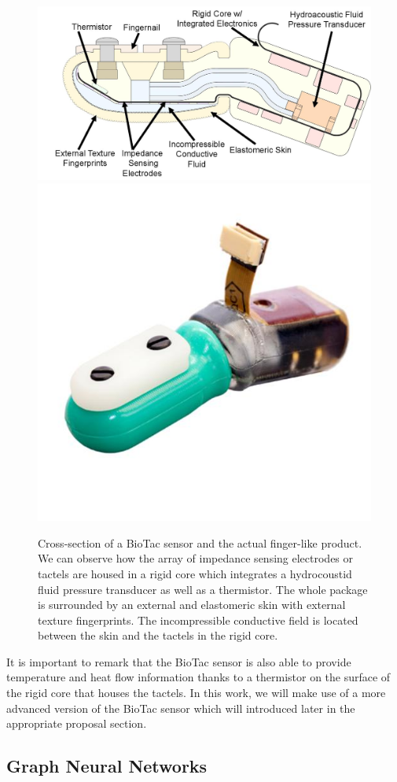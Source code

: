 \begin{figure}[!thb]
    \centering
    \includegraphics[width=0.65\linewidth]{Figures/Tactile/biotac_1}
    \includegraphics[width=0.34\linewidth]{Figures/Tactile/biotac_2}
    \caption{Cross-section of a BioTac sensor \cite{Syntouch2018} and the actual finger-like product. We can observe how the array of impedance sensing electrodes or tactels are housed in a rigid core which integrates a hydrocoustid fluid pressure transducer as well as a thermistor. The whole package is surrounded by an external and elastomeric skin with external texture fingerprints. The incompressible conductive field is located between the skin and the tactels in the rigid core.}
    \label{fig:tactile:biotac_sensor}
\end{figure}

It is important to remark that the BioTac sensor is also able to provide temperature and heat flow information thanks to a thermistor on the surface of the rigid core that houses the tactels. In this work, we will make use of a more advanced version of the BioTac sensor which will introduced later in the appropriate proposal section.

\subsection{Graph Neural Networks}

